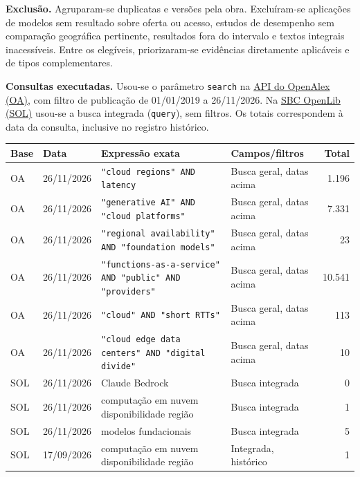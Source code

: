 \documentclass[12pt,a4paper]{article}
\begin{document}
\medskip
\noindent\textbf{Exclusão.} Agruparam-se duplicatas e versões pela obra. Excluíram-se aplicações de modelos sem resultado sobre oferta ou acesso, estudos de desempenho sem comparação geográfica pertinente, resultados fora do intervalo e textos integrais inacessíveis. Entre os elegíveis, priorizaram-se evidências diretamente aplicáveis e de tipos complementares.

\medskip
\noindent\textbf{Consultas executadas.} Usou-se o parâmetro \texttt{search} na \href{https://api.openalex.org/works}{API do OpenAlex (OA)}, com filtro de publicação de 01/01/2019 a 26/11/2026. Na \href{https://sol.sbc.org.br/busca/index.php/integrada/results}{SBC OpenLib (SOL)} usou-se a busca integrada (\texttt{query}), sem filtros. Os totais correspondem à data da consulta, inclusive no registro histórico.

\medskip
{\small
\setlength{\tabcolsep}{4pt}
\renewcommand{\arraystretch}{1.16}
\noindent\begin{tabularx}{\textwidth}{@{}l l Y P{2.65cm} r@{}}
\toprule
Base & Data & Expressão exata & Campos/filtros & Total \\
\midrule
OA & 26/11/2026 & \texttt{"cloud regions" AND latency} & Busca geral, datas acima & 1.196 \\
OA & 26/11/2026 & \texttt{"generative AI" AND "cloud platforms"} & Busca geral, datas acima & 7.331 \\
OA & 26/11/2026 & \texttt{"regional availability" AND "foundation models"} & Busca geral, datas acima & 23 \\
OA & 26/11/2026 & \texttt{"functions-as-a-service" AND "public" AND "providers"} & Busca geral, datas acima & 10.541 \\
OA & 26/11/2026 & \texttt{"cloud" AND "short RTTs"} & Busca geral, datas acima & 113 \\
OA & 26/11/2026 & \texttt{"cloud edge data centers" AND "digital divide"} & Busca geral, datas acima & 10 \\
SOL & 26/11/2026 & Claude Bedrock & Busca integrada & 0 \\
SOL & 26/11/2026 & computação em nuvem disponibilidade região & Busca integrada & 1 \\
SOL & 26/11/2026 & modelos fundacionais & Busca integrada & 5 \\
SOL & 17/09/2026 & computação em nuvem disponibilidade região & Integrada, histórico & 1 \\
\bottomrule
\end{tabularx}
}
\end{document}
